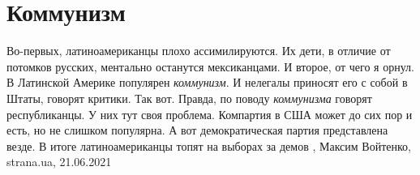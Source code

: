  
 
 
 
 
\chapter{Коммунизм}

Во-первых, латиноамериканцы плохо ассимилируются. Их дети, в отличие от
потомков русских, ментально останутся мексиканцами. И второе, от чего я орнул.
В Латинской Америке популярен \emph{коммунизм}. И нелегалы приносят его с собой в
Штаты, говорят критики.  Так вот. Правда, по поводу \emph{коммунизма} говорят
республиканцы. У них тут своя проблема. Компартия в США может до сих пор и
есть, но не слишком популярна. А вот демократическая партия представлена везде.
В итоге латиноамериканцы топят на выборах за демов
, 
Максим Войтенко, strana.ua, 21.06.2021

